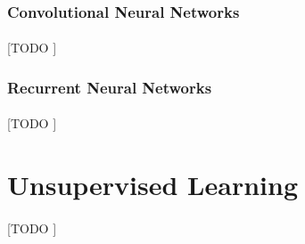 \documentclass{article}
\begin{document}
			\subsubsection{Convolutional Neural Networks}
			\label{sec:cnn}

				\paragraph{}
				[TODO ]

			\subsubsection{Recurrent Neural Networks}
			\label{sec:rnn}

				\paragraph{}
				[TODO ]

	\section{Unsupervised Learning}
	\label{sec:unsupervised-learning}

			\paragraph{}
			[TODO ]


	\nocite{subject:taa}
	\nocite{pactk:py-machine-learning}

  
  
\end{document}
